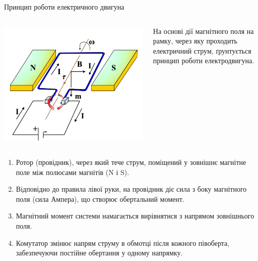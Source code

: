 \documentclass{beamer}
\begin{document}
\begin{frame}{Принцип роботи електричного двигуна}{}

\begin{columns}
	\begin{column}{0.4\linewidth}\centering\scriptsize
         \includegraphics[width=1\linewidth]{motor}
	\end{column}
	\begin{column}{0.6\linewidth}
\begin{block}{}\justifying
На основі дії магнітного поля на рамку, через яку проходить електричний струм, ґрунтується принцип роботи електродвигуна.
\end{block}
	\end{column}
\end{columns}
\begin{block}{}\scriptsize
        \begin{enumerate}
        \item Ротор (провідник), через який тече струм, поміщений у зовнішнє магнітне поле між полюсами магнітів (N і S).
        \item Відповідно до правила лівої руки, на провідник діє сила з боку магнітного поля (сила Ампера), що створює обертальний момент.
        \item Магнітний момент системи намагається вирівнятися з напрямом зовнішнього поля.
        \item Комутатор змінює напрям струму в обмотці після кожного півоберта, забезпечуючи постійне обертання у одному напрямку.
    \end{enumerate}
\end{block}
\end{frame}
\end{document}
